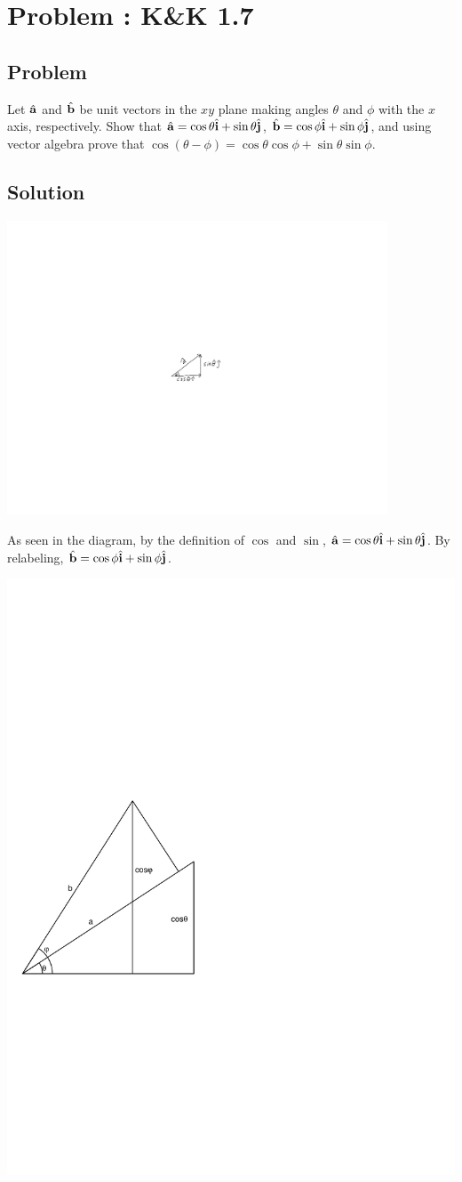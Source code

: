 \documentclass[solutions]{esg8012pset}
\providecommand{\uvec}[1]{{\hat{\bf{#1}}}}
\begin{document}
\section{Problem \thesection: K\&K 1.7}
\subsection{Problem}
  Let $\uvec a$ and $\uvec b$ be unit vectors in the $xy$ plane making angles $\theta$ and $\phi$ with the $x$ axis,
  respectively. Show that $\uvec a = \cos\theta\uvec i + \sin\theta\uvec j$, $\uvec b = \cos\phi\uvec i + \sin\phi\uvec j$, and using vector algebra prove
that $\cos(\theta -\phi ) = \cos\theta \cos\phi + \sin\theta \sin\phi$.
\subsection{Solution}
  \includegraphics[width=0.85\textwidth]{ps01_Diagram_1}

  As seen in the diagram, by the definition of $\cos$ and $\sin$, $\uvec a = \cos\theta\uvec i + \sin\theta\uvec j$.  By relabeling, $\uvec b = \cos\phi\uvec i + \sin\phi\uvec j$.
  \begin{center}\includegraphics[width=.33\textwidth]{ps01_Diagram_2}\end{center}
\end{document}
